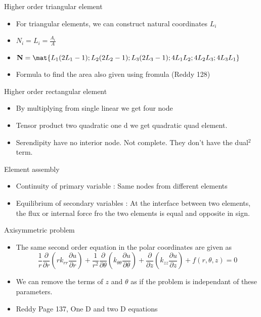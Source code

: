	\begin{frame}{Higher order triangular element}
		\begin{itemize}
			\item For triangular elements, we can construct natural coordinates $L_i$
			\item $N_i = L_i = \frac{A_i}{A}$
			\item $\ve{N} = \mat{L_1(2L_1-1);L_2(2L_2-1);L_3(2L_3-1);4L_1L_2;4L_2L_3;4L_3L_1}$
			\item Formula to find the area also given using fromula (Reddy 128)
		\end{itemize}
 	\end{frame}


	\begin{frame}{Higher order rectangular element}
		\begin{itemize}
			\item By multiplying from single linear we get four node
			\item Tensor product two quadratic one d we get quadratic quad element. 
			\item Serendipity have no interior node. Not complete. They don't have the dual$^2$ term. 
		\end{itemize}
	\end{frame}



	\begin{frame}{Element assembly}
		\begin{itemize}
			\item Continuity of primary variable : Same nodes from different elements
			\item Equilibrium of secondary variables : At the interface between two elements, the flux or internal force fro the two elements is equal and opposite in sign. 
			
		\end{itemize}
	\end{frame}



	\begin{frame}{Axisymmetric problem}
		\begin{itemize}
			\item   The same second order equation in the polar coordinates are given as 
			\begin{equation}
				\frac{1}{r}\frac{\partial }{\partial r}\left(r k_{rr} \frac{\partial u}{\partial r} \right)
				+ \frac{1}{r^2}\frac{\partial }{\partial \theta}\left( k_{\theta\theta} \frac{\partial u}{\partial \theta} \right)
				+ \frac{\partial }{\partial z}\left(k_{zz} \frac{\partial u}{\partial z} \right) + f(r,\theta,z)=0
			\end{equation}
			\item We can remove the terms of $z$ and $\theta$ as if the problem is independant of these parameters. 
			\item Reddy Page 137, One D and two D equations
		\end{itemize}
	\end{frame}




